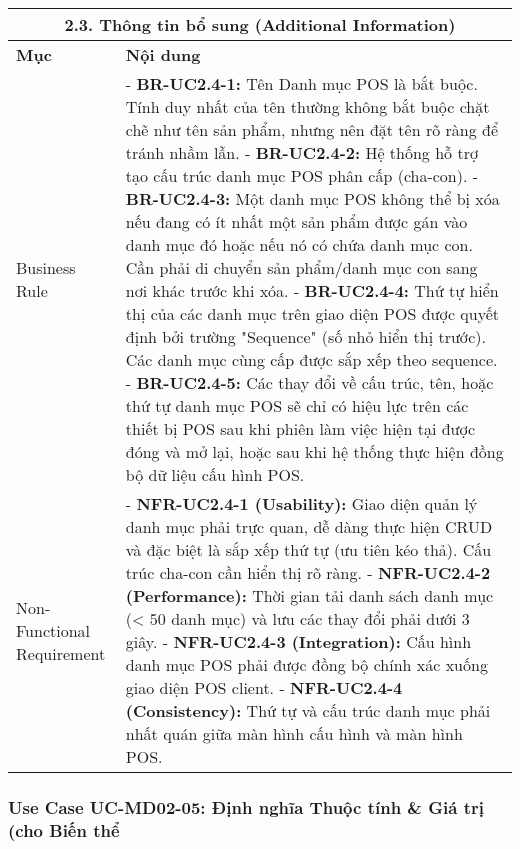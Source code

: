 \begin{longtable}{|m{4cm}|p{11cm}|}
\hline
\multicolumn{2}{|c|}{\textbf{2.3. Thông tin bổ sung (Additional Information)}} \\
\hline
\textbf{Mục} & \textbf{Nội dung} \\
\hline
Business Rule & - \textbf{BR-UC2.4-1:} Tên Danh mục POS là bắt buộc. Tính duy nhất của tên thường không bắt buộc chặt chẽ như tên sản phẩm, nhưng nên đặt tên rõ ràng để tránh nhầm lẫn. \newline - \textbf{BR-UC2.4-2:} Hệ thống hỗ trợ tạo cấu trúc danh mục POS phân cấp (cha-con). \newline - \textbf{BR-UC2.4-3:} Một danh mục POS không thể bị xóa nếu đang có ít nhất một sản phẩm được gán vào danh mục đó hoặc nếu nó có chứa danh mục con. Cần phải di chuyển sản phẩm/danh mục con sang nơi khác trước khi xóa. \newline - \textbf{BR-UC2.4-4:} Thứ tự hiển thị của các danh mục trên giao diện POS được quyết định bởi trường "Sequence" (số nhỏ hiển thị trước). Các danh mục cùng cấp được sắp xếp theo sequence. \newline - \textbf{BR-UC2.4-5:} Các thay đổi về cấu trúc, tên, hoặc thứ tự danh mục POS sẽ chỉ có hiệu lực trên các thiết bị POS sau khi phiên làm việc hiện tại được đóng và mở lại, hoặc sau khi hệ thống thực hiện đồng bộ dữ liệu cấu hình POS. \\
\hline
Non-Functional Requirement & - \textbf{NFR-UC2.4-1 (Usability):} Giao diện quản lý danh mục phải trực quan, dễ dàng thực hiện CRUD và đặc biệt là sắp xếp thứ tự (ưu tiên kéo thả). Cấu trúc cha-con cần hiển thị rõ ràng. \newline - \textbf{NFR-UC2.4-2 (Performance):} Thời gian tải danh sách danh mục (< 50 danh mục) và lưu các thay đổi phải dưới 3 giây. \newline - \textbf{NFR-UC2.4-3 (Integration):} Cấu hình danh mục POS phải được đồng bộ chính xác xuống giao diện POS client. \newline - \textbf{NFR-UC2.4-4 (Consistency):} Thứ tự và cấu trúc danh mục phải nhất quán giữa màn hình cấu hình và màn hình POS. \\
\hline

\end{longtable}

\subsubsection{Use Case UC-MD02-05: Định nghĩa Thuộc tính \& Giá trị (cho Biến thể}

